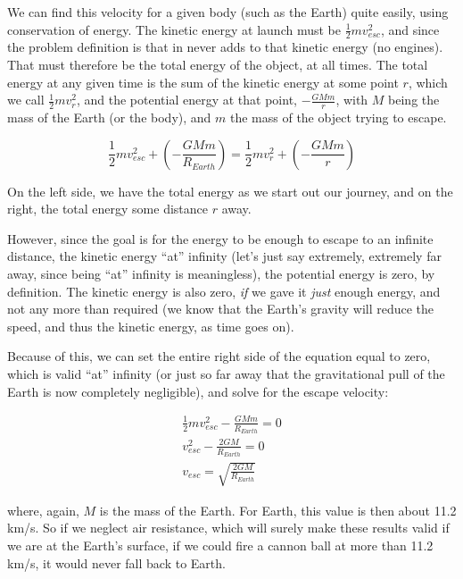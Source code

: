 \documentclass[12pt,a4paper]{report}
\begin{document}
We can find this velocity for a given body (such as the Earth) quite easily, using conservation of energy. The kinetic energy at launch must be $\displaystyle \frac{1}{2} m v_{esc}^2$, and since the problem definition is that in never adds to that kinetic energy (no engines). That must therefore be the total energy of the object, at all times. The total energy at any given time is the sum of the kinetic energy at some point $r$, which we call $\displaystyle \frac{1}{2} m v_r^2$, and the potential energy at that point, $\displaystyle - \frac{G M m}{r}$, with $M$ being the mass of the Earth (or the body), and $m$ the mass of the object trying to escape.

\begin{equation}
\frac{1}{2} m v_{esc}^2 + \left(-\frac{G M m}{R_{Earth}}\right) = \frac{1}{2} m v_r^2 + \left(-\frac{G M m}{r}\right)
\end{equation}

On the left side, we have the total energy as we start out our journey, and on the right, the total energy some distance $r$ away.

However, since the goal is for the energy to be enough to escape to an infinite distance, the kinetic energy ``at'' infinity (let's just say extremely, extremely far away, since being ``at'' infinity is meaningless), the potential energy is zero, by definition. The kinetic energy is also zero, \emph{if} we gave it \emph{just} enough energy, and not any more than required (we know that the Earth's gravity will reduce the speed, and thus the kinetic energy, as time goes on).

Because of this, we can set the entire right side of the equation equal to zero, which is valid ``at'' infinity (or just so far away that the gravitational pull of the Earth is now completely negligible), and solve for the escape velocity:

\begin{align}
\frac{1}{2} m v_{esc}^2 -\frac{G M m}{R_{Earth}} = 0\\
v_{esc}^2 -\frac{2 G M}{R_{Earth}} = 0\\
v_{esc} = \sqrt{\frac{2 G M}{R_{Earth}}}
\end{align}

where, again, $M$ is the mass of the Earth. For Earth, this value is then about 11.2 km/s. So if we neglect air resistance, which will surely make these results valid if we are at the Earth's surface, if we could fire a cannon ball at more than 11.2 km/s, it would never fall back to Earth.
\end{document}
